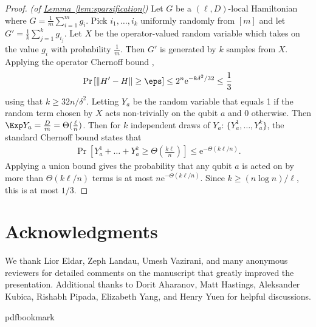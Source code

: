 \documentclass[11pt]{article}
\newcommand{\expref}[2]{\texorpdfstring{\hyperref[#2]{#1~\ref{#2}}}{#1~\ref{#2}}}
\newcommand{\eee}{\mathrm e}
\begin{document}
\begin{proof}\textit{(of \expref{Lemma}{lem:sparsification})}
Let $G$ be a $(\ell, D)$-local Hamiltonian where $G = \frac{1}{m} \sum_{i = 1}^m g_i$. Pick $i_1, \ldots, i_k$ uniformly randomly from $[m]$ and let $G' = \frac{1}{k} \sum_{j = 1}^k g_{i_j}$. Let $X$ be the operator-valued random variable which takes on the value $g_i$ with probability $\frac{1}{m}$. Then $G'$ is generated by $k$ samples from $X$. Applying the operator Chernoff bound \cite[Lemma 2.8]{tropp},
\begin{align}
    \Pr\left[\|H'-H\|\geq \eps\right]\leq 2^n \eee^{-k \delta^2/32} \leq \frac{1}{3}
\end{align}
using that $k \geq 32n/\delta^2$. Letting $Y_a$ be the random variable that equals 1 if the random term chosen by $X$ acts non-trivially on the qubit $a$ and 0 otherwise. Then $\Exp Y_a = \frac{D}{m} = \Theta(\frac{\ell}{n})$. Then for $k$ independent draws of $Y_a$: $\{Y_a^1, \ldots, Y_a^k\}$, the standard Chernoff bound states that
\begin{align}
    \Pr \left[ Y_a^1 + \ldots + Y_a^k \geq \Theta \left( \frac{k\ell}{n}\right) \right] \leq \eee^{-\Theta(k \ell/n)}.
\end{align}
Applying a union bound gives the probability that any qubit $a$ is acted on by more than $\Theta(k \ell/n)$ terms is at most $n \eee^{-\Theta(k\ell/n)}$. Since $k \geq (n \log n) / \ell$, this is at most $1/3$.
\end{proof}


\section*{Acknowledgments}
We thank Lior Eldar, Zeph Landau, Umesh Vazirani, and many anonymous reviewers for detailed comments on the manuscript that greatly improved the presentation. Additional thanks to Dorit Aharanov, Matt Hastings, Aleksander Kubica, Rishabh Pipada, Elizabeth Yang, and Henry Yuen for helpful discussions. 

\newcommand{\prelim}{Preliminary version in\ }\newcommand{\prelims}{Preliminary
  versions in\ }
\providecommand{\bibhead}[1]{}
\expandafter\ifx\csname pdfbookmark\endcsname\relax%
  \providecommand{\tocrefpdfbookmark}{}
\else\providecommand{\tocrefpdfbookmark}{%
   \hypertarget{tocreferences}{}%
   \pdfbookmark[1]{References}{tocreferences}}%
\fi
\end{document}

